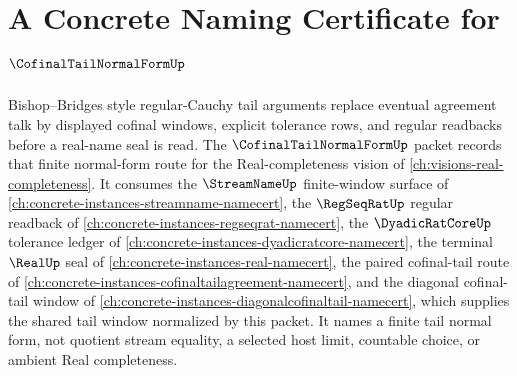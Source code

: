 \chapter{A Concrete Naming Certificate for $\CofinalTailNormalFormUp$}
\label{ch:concrete-instances-cofinal-tail-normal-form-namecert}

Bishop--Bridges style regular-Cauchy tail arguments replace eventual agreement talk by displayed cofinal windows, explicit tolerance rows, and regular readbacks before a real-name seal is read. The $\CofinalTailNormalFormUp$ packet records that finite normal-form route for the Real-completeness vision of \autoref{ch:visions-real-completeness}. It consumes the $\StreamNameUp$ finite-window surface of \autoref{ch:concrete-instances-streamname-namecert}, the $\RegSeqRatUp$ regular readback of \autoref{ch:concrete-instances-regseqrat-namecert}, the $\DyadicRatCoreUp$ tolerance ledger of \autoref{ch:concrete-instances-dyadicratcore-namecert}, the terminal $\RealUp$ seal of \autoref{ch:concrete-instances-real-namecert}, the paired cofinal-tail route of \autoref{ch:concrete-instances-cofinaltailagreement-namecert}, and the diagonal cofinal-tail window of \autoref{ch:concrete-instances-diagonalcofinaltail-namecert}, which supplies the shared tail window normalized by this packet. It names a finite tail normal form, not quotient stream equality, a selected host limit, countable choice, or ambient Real completeness.

